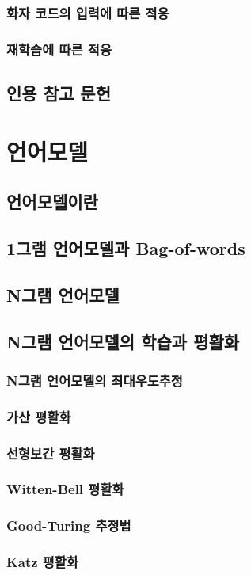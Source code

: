 \documentclass{book}
\begin{document}
\subsection{화자 코드의 입력에 따른 적응}
\subsection{재학습에 따른 적응}
\section*{인용 참고 문헌}

\chapter{언어모델}
\section{언어모델이란}
\section{1그램 언어모델과 Bag-of-words}
\section{N그램 언어모델}
\section{N그램 언어모델의 학습과 평활화}
\subsection{N그램 언어모델의 최대우도추정}
\subsection{가산 평활화}
\subsection{선형보간 평활화}
\subsection{Witten-Bell 평활화}
\subsection{Good-Turing 추정법}
\subsection{Katz 평활화}
\end{document}

